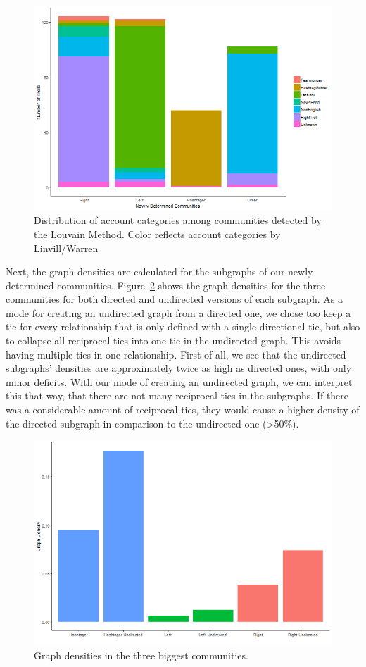 \documentclass[12pt, titlepage=true, toc=bib]{scrartcl}
\begin{document}
\begin{figure}[!ht]
\centering
\includegraphics[width=0.95\linewidth]{final_figure2.png}%
\caption{Distribution of account categories among communities detected by the Louvain Method. Color reflects account categories by Linvill/Warren}
\label{fig:distcat}
\end{figure}

Next, the graph densities are calculated for the subgraphs of our newly determined communities. Figure~\ref{fig:dens} shows the graph densities for the three communities for both directed and undirected versions of each subgraph. As a mode for creating an undirected graph from a directed one, we chose too keep a tie for every relationship that is only defined with a single directional tie, but also to collapse all reciprocal ties into one tie in the undirected graph. This avoids having multiple ties in one relationship. First of all, we see that the undirected subgraphs' densities are approximately twice as high as directed ones, with only minor deficits. With our mode of creating an undirected graph, we can interpret this that way, that there are not many reciprocal ties in the subgraphs. If there was a considerable amount of reciprocal ties, they would cause a higher density of the directed subgraph in comparison to the undirected one (>50\%).

\begin{figure}[!ht]
\centering
\includegraphics[width=0.95\linewidth]{figure3.png}
\caption{Graph densities in the three biggest communities.}
\label{fig:dens}
\end{figure}
\end{document}
